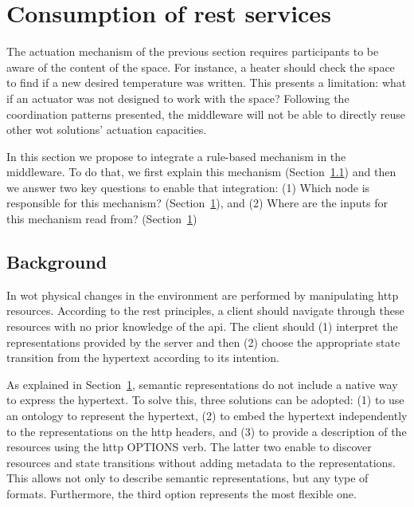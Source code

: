 
\section{Consumption of \acs{rest} services}


The actuation mechanism of the previous section requires participants to be aware of the content of the space.
For instance, a heater should check the space to find if a new desired temperature was written.
This presents a limitation: what if an actuator was not designed to work with the space?
Following the coordination patterns presented, the middleware will not be able to directly reuse other \ac{wot} solutions' actuation capacities. %


In this section we propose to integrate a rule-based mechanism in the middleware.
To do that, we first explain this mechanism (Section~\ref{sec:background_restdesc}) and then we answer two key questions to enable that integration:
(1) Which node is responsible for this mechanism? (Section~\ref{}), and
(2) Where are the inputs for this mechanism read from? (Section~\ref{})


\subsection{Background}
\label{sec:background_restdesc}

In \ac{wot} physical changes in the environment are performed by manipulating \ac{http} resources.
According to the \ac{rest} principles, a client should navigate through these resources with no prior knowledge of the \ac{api}.
The client should (1) interpret the representations provided by the server and then (2) choose the appropriate state transition from the hypertext according to its intention. %


As explained in Section~\ref{}, semantic representations do not include a native way to express the hypertext.
To solve this, three solutions can be adopted:
(1) to use an ontology to represent the hypertext,
(2) to embed the hypertext independently to the representations on the \ac{http} headers, and %
(3) to provide a description of the resources using the \ac{http} OPTIONS verb.
The latter two enable to discover resources and state transitions without adding metadata to the representations.
This allows not only to describe semantic representations, but any type of formats.
Furthermore, the third option represents the most flexible one.


